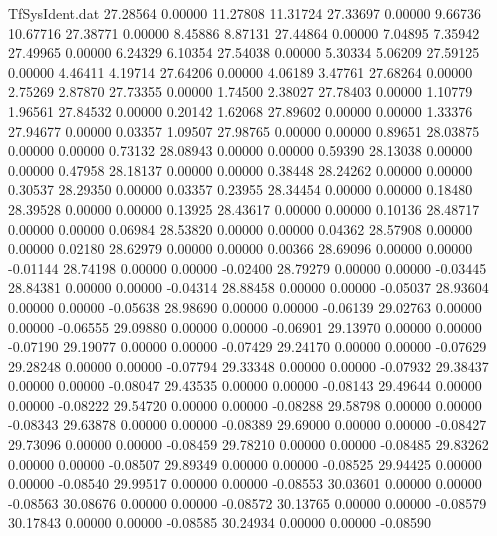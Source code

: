 \begin{filecontents}{TfSysIdent.dat}
  27.28564    0.00000   11.27808   11.31724
  27.33697    0.00000    9.66736   10.67716
  27.38771    0.00000    8.45886    8.87131
  27.44864    0.00000    7.04895    7.35942
  27.49965    0.00000    6.24329    6.10354
  27.54038    0.00000    5.30334    5.06209
  27.59125    0.00000    4.46411    4.19714
  27.64206    0.00000    4.06189    3.47761
  27.68264    0.00000    2.75269    2.87870
  27.73355    0.00000    1.74500    2.38027
  27.78403    0.00000    1.10779    1.96561
  27.84532    0.00000    0.20142    1.62068
  27.89602    0.00000    0.00000    1.33376
  27.94677    0.00000    0.03357    1.09507
  27.98765    0.00000    0.00000    0.89651
  28.03875    0.00000    0.00000    0.73132
  28.08943    0.00000    0.00000    0.59390
  28.13038    0.00000    0.00000    0.47958
  28.18137    0.00000    0.00000    0.38448
  28.24262    0.00000    0.00000    0.30537
  28.29350    0.00000    0.03357    0.23955
  28.34454    0.00000    0.00000    0.18480
  28.39528    0.00000    0.00000    0.13925
  28.43617    0.00000    0.00000    0.10136
  28.48717    0.00000    0.00000    0.06984
  28.53820    0.00000    0.00000    0.04362
  28.57908    0.00000    0.00000    0.02180
  28.62979    0.00000    0.00000    0.00366
  28.69096    0.00000    0.00000   -0.01144
  28.74198    0.00000    0.00000   -0.02400
  28.79279    0.00000    0.00000   -0.03445
  28.84381    0.00000    0.00000   -0.04314
  28.88458    0.00000    0.00000   -0.05037
  28.93604    0.00000    0.00000   -0.05638
  28.98690    0.00000    0.00000   -0.06139
  29.02763    0.00000    0.00000   -0.06555
  29.09880    0.00000    0.00000   -0.06901
  29.13970    0.00000    0.00000   -0.07190
  29.19077    0.00000    0.00000   -0.07429
  29.24170    0.00000    0.00000   -0.07629
  29.28248    0.00000    0.00000   -0.07794
  29.33348    0.00000    0.00000   -0.07932
  29.38437    0.00000    0.00000   -0.08047
  29.43535    0.00000    0.00000   -0.08143
  29.49644    0.00000    0.00000   -0.08222
  29.54720    0.00000    0.00000   -0.08288
  29.58798    0.00000    0.00000   -0.08343
  29.63878    0.00000    0.00000   -0.08389
  29.69000    0.00000    0.00000   -0.08427
  29.73096    0.00000    0.00000   -0.08459
  29.78210    0.00000    0.00000   -0.08485
  29.83262    0.00000    0.00000   -0.08507
  29.89349    0.00000    0.00000   -0.08525
  29.94425    0.00000    0.00000   -0.08540
  29.99517    0.00000    0.00000   -0.08553
  30.03601    0.00000    0.00000   -0.08563
  30.08676    0.00000    0.00000   -0.08572
  30.13765    0.00000    0.00000   -0.08579
  30.17843    0.00000    0.00000   -0.08585
  30.24934    0.00000    0.00000   -0.08590

\end{filecontents}
